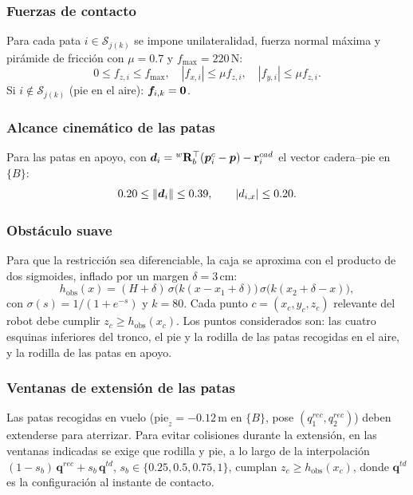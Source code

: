 \subsubsection{Fuerzas de contacto}
Para cada pata $i\in\mathcal S_{j(k)}$ se impone unilateralidad, fuerza normal máxima y pirámide de fricción con $\mu=0.7$ y $f_{\max}=220$\,N:
\begin{equation*}
0\le f_{z,i}\le f_{\max},\quad |f_{x,i}|\le\mu f_{z,i},\quad |f_{y,i}|\le\mu f_{z,i}.
\end{equation*}
Si $i\notin\mathcal S_{j(k)}$ (pie en el aire): $\bm{f}_{i,k}=\mathbf 0$.

\subsubsection{Alcance cinemático de las patas}
Para las patas en apoyo, con $\bm{d}_i={}^w\mathbf{R}_b^{\top}(\bm{p}^c_i-\bm{p})-\mathbf r^{cad}_i$ el vector cadera--pie en $\{B\}$:
\begin{equation*}
0.20\le\|\bm{d}_i\|\le0.39,\qquad |d_{i,x}|\le0.20 .
\end{equation*}

\subsubsection{Obstáculo suave}
Para que la restricción sea diferenciable, la caja se aproxima con el producto de dos sigmoides, inflado por un margen $\delta=3$\,cm:
\begin{equation*}
h_{\mathrm{obs}}(x)=(H+\delta)\,\sigma\!\big(k(x-x_1+\delta)\big)\,\sigma\!\big(k(x_2+\delta-x)\big),
\end{equation*}
con $\sigma(s)=1/(1+e^{-s})$ y $k=80$. Cada punto $c=(x_c,y_c,z_c)$ relevante del robot debe cumplir $z_c\ge h_{\mathrm{obs}}(x_c)$. Los puntos considerados son: las cuatro esquinas inferiores del tronco, el pie y la rodilla de las patas recogidas en el aire, y la rodilla de las patas en apoyo.

\subsubsection{Ventanas de extensión de las patas}
Las patas recogidas en vuelo ($\mathrm{pie}_z=-0.12$\,m en $\{B\}$, pose $(q_1^{rec},q_2^{rec})$) deben extenderse para aterrizar.
Para evitar colisiones durante la extensión, en las ventanas indicadas se exige que rodilla y pie, a lo largo de la interpolación $(1-s_b)\,\bm q^{rec}+s_b\,\bm q^{td}$, $s_b\in\{0.25,0.5,0.75,1\}$, cumplan $z_c\ge h_{\mathrm{obs}}(x_c)$, donde $\bm q^{td}$ es la configuración al instante de contacto.

